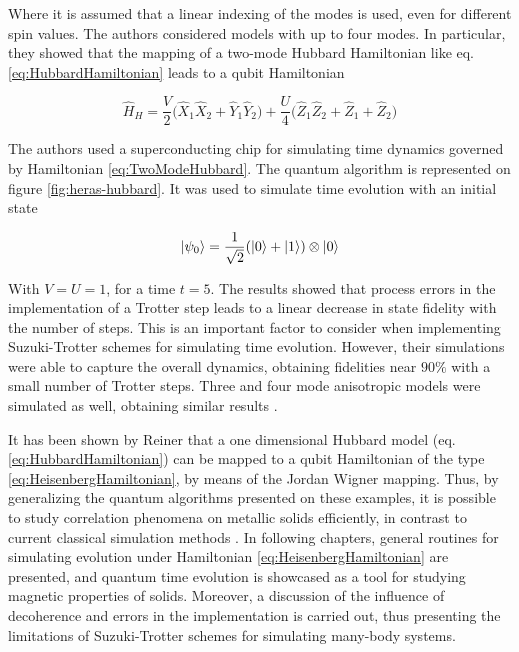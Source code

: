   Where it is assumed that a linear indexing of the modes is used, even for different spin values. The authors considered models with up to four modes. In particular, they showed that the mapping of a two-mode Hubbard Hamiltonian like eq. \ref{eq:HubbardHamiltonian} leads to a qubit Hamiltonian

  \begin{equation}
    \hat{H}_H = \frac{V}{2}\big(\hat{X}_1 \hat{X}_2 + \hat{Y}_1 \hat{Y}_2\big) + \frac{U}{4} \big(\hat{Z}_1 \hat{Z}_2 + \hat{Z}_1 + \hat{Z}_2\big)
    \label{eq:TwoModeHubbard}
  \end{equation}

  The authors used a superconducting chip for simulating time dynamics governed by Hamiltonian \ref{eq:TwoModeHubbard}. The quantum algorithm is represented on figure \ref{fig:heras-hubbard}. It was used to simulate time evolution with an initial state
  
  $$
  \ket{\psi_0} = \frac{1}{\sqrt{2}}(\ket{0} + \ket{1}) \otimes \ket{0}
  $$

  With $V=U=1$, for a time $t=5$. The results showed that process errors in the implementation of a Trotter step leads to a linear decrease in state fidelity with the number of steps. This is an important factor to consider when implementing Suzuki-Trotter schemes for simulating time evolution. However, their simulations were able to capture the overall dynamics, obtaining fidelities near $90\%$ with a small number of Trotter steps. Three and four mode anisotropic models were simulated as well, obtaining similar results \cite{HubbardSimulLasHeras}.

  It has been shown by Reiner \cite{Mastersthesis} that a one dimensional Hubbard model (eq. \ref{eq:HubbardHamiltonian}) can be mapped to a qubit Hamiltonian of the type \ref{eq:HeisenbergHamiltonian}, by means of the Jordan Wigner mapping. Thus, by generalizing the quantum algorithms presented on these examples, it is possible to study correlation phenomena on metallic solids efficiently, in contrast to current classical simulation methods \cite{Mastersthesis,HubbardOriginal}. In following chapters,  general routines for simulating evolution under Hamiltonian \ref{eq:HeisenbergHamiltonian} are presented, and quantum time evolution is showcased as a tool for studying magnetic properties of solids. Moreover, a discussion of the influence of decoherence and errors in the implementation is carried out, thus presenting the limitations of Suzuki-Trotter schemes for simulating many-body systems.

  

  

  
